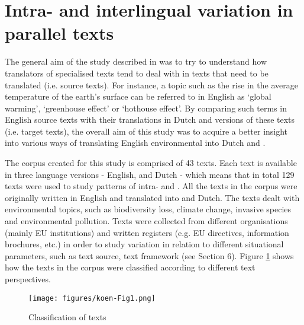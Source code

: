 \documentclass[output=paper]{langsci/langscibook.cls}
\begin{document}
\section{Intra- and interlingual variation in parallel texts}\label{sec:3}
 
The general aim of the study described in \citet{Kerremans2012} was to try to understand 
how translators of specialised texts tend to deal with  
in texts that need to be translated (i.e. source texts). For instance, a topic 
such as the rise in the average temperature of the earth's surface can be referred 
to in English as `global warming', `greenhouse effect' or `hothouse effect'. By 
comparing such terms in English source texts with their translations in Dutch and 
 versions of these texts (i.e. target texts), the overall aim of this study 
was to acquire a better insight into various ways of translating English environmental 
 into Dutch and .

\newpage 
The corpus created for this study is comprised of 43 texts. Each text is available in three language versions - English,  and Dutch - which means that in total 129 texts were used to study patterns of intra- and . All 
the texts in the corpus were originally written in English and translated into  and Dutch. The texts dealt with environmental topics, such as biodiversity loss, climate change, invasive species and environmental pollution. Texts were 
collected from different organisations (mainly EU institutions) and written registers (e.g. EU directives, information brochures, etc.) in order to study variation in relation to different situational parameters, such as text source, text framework 
(see Section 6). Figure \ref{fig:k1} shows how the texts in the corpus were classified according to different text perspectives.

\begin{figure}[t]
\texttt{[image: figures/koen-Fig1.png]}
\caption{Classification of texts}
\label{fig:k1}
\end{figure}
\end{document}
